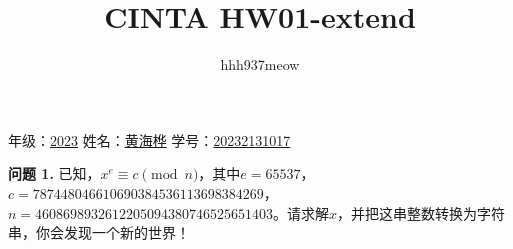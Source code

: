 \documentclass[a4paper]{CINTA}
\title{CINTA HW01-extend}
\author{hhh937meow}
\begin{document}
\maketitle
\begin{center}
    年级：\underline{2023\hspace{1.5cm}}
    姓名：\underline{黄海桦\hspace{1.5cm}}
    学号：\underline{20232131017\hspace{2.5cm}}
\end{center}

\textbf{问题 1.} 已知，$x^e \equiv c \pmod{n}$，其中$e = 65537$，$c = 787448046610690384536113698384269$，$n = 4608698932612205094380746525651403$。请求解$x$，并把这串整数转换为字符串，你会发现一个新的世界！
\end{document}
